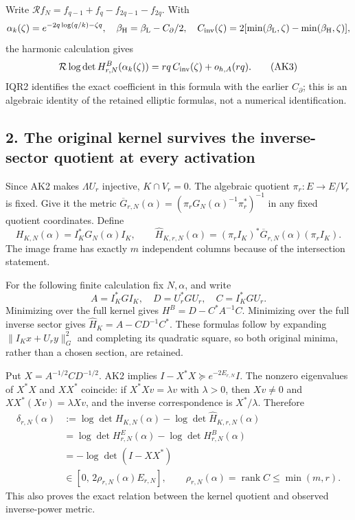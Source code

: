\documentclass[11pt]{article}
\begin{document}
Write \(\mathcal R f_N=f_{q-1}+f_q-f_{2q-1}-f_{2q}\). With \[
\alpha_k(\zeta)=e^{-2q\log(q/k)-\zeta q},\quad
\beta_{\rm H}=\beta_{\rm L}-C_\partial/2,
\quad
C_{\rm inv}(\zeta)=2[\min(\beta_{\rm L},\zeta)-\min(\beta_{\rm H},\zeta)],
\] the harmonic calculation gives \[
\mathcal R\log\det H^B_{r,N}(\alpha_k(\zeta))
 =rq\,C_{\rm inv}(\zeta)+o_{h,A}(rq). \tag{AK3}
\] IQR2 identifies the exact coefficient in this formula with the earlier \(C_\partial\); this is an algebraic identity of the retained elliptic formulas, not a numerical identification.

\subsection{2. The original kernel survives the inverse-sector quotient at every activation}\label{the-original-kernel-survives-the-inverse-sector-quotient-at-every-activation}

Since AK2 makes \(\Lambda U_r\) injective, \(K\cap V_r=0\). The algebraic quotient \(\pi_r:E\to E/V_r\) is fixed. Give it the metric \(\overline G_{r,N}(\alpha)=(\pi_rG_N(\alpha)^{-1}\pi_r^*)^{-1}\) in any fixed quotient coordinates. Define \[
H_{K,N}(\alpha)=I_K^*G_N(\alpha)I_K,\qquad
\widehat H_{K,r,N}(\alpha)
 =(\pi_r I_K)^*\overline G_{r,N}(\alpha)(\pi_r I_K).
\tag{AK4}
\] The image frame has exactly \(m\) independent columns because of the intersection statement.

For the following finite calculation fix \(N,\alpha\), and write \[
A=I_K^*GI_K,\quad D=U_r^*GU_r,\quad C=I_K^*GU_r.
\] Minimizing over the full kernel gives \(H^B=D-C^*A^{-1}C\). Minimizing over the full inverse sector gives \(\widehat H_K=A-CD^{-1}C^*\). These formulas follow by expanding \(\|I_Kx+U_ry\|_G^2\) and completing its quadratic square, so both original minima, rather than a chosen section, are retained.

Put \(X=A^{-1/2}CD^{-1/2}\). AK2 implies \(I-X^*X\succeq e^{-2E_{r,N}}I\). The nonzero eigenvalues of \(X^*X\) and \(XX^*\) coincide: if \(X^*Xv=\lambda v\) with \(\lambda>0\), then \(Xv\ne0\) and \(XX^*(Xv)=\lambda Xv\), and the inverse correspondence is \(X^*/\lambda\). Therefore \[
\begin{split}
\delta_{r,N}(\alpha)
&:=\log\det H_{K,N}(\alpha)-\log\det\widehat H_{K,r,N}(\alpha)\\
&=\log\det H^E_{r,N}(\alpha)-\log\det H^B_{r,N}(\alpha)\\
&=-\log\det(I-XX^*)\\
&\in[0,\,2\rho_{r,N}(\alpha)E_{r,N}],
\qquad \rho_{r,N}(\alpha)=\operatorname{rank}C\le\min(m,r).
\end{split}\tag{AK5}
\] This also proves the exact relation between the kernel quotient and observed inverse-power metric.
\end{document}
